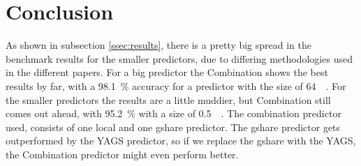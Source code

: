 \section{Conclusion}
\label{sec:conclusion}
As shown in subsection \ref{ssec:results}, there is a pretty big spread in the benchmark results for the smaller predictors, due to differing methodologies used in the different papers.
For a big predictor the Combination shows the best results by far, with a \SI{98.1}{\percent} accuracy for a predictor with the size of \SI{64}{\kilo\byte}.
For the smaller predictors the results are a little muddier, but Combination still comes out ahead, with \SI{95.2}{\percent} with a size of \SI{0.5}{\kilo\byte}.
The combination predictor used, consists of one local and one gshare predictor.
The gshare predictor gets outperformed by the YAGS predictor, so if we replace the gshare with the YAGS, the Combination predictor might even perform better.
